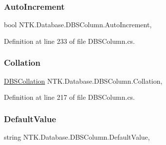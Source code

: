 \subsubsection{\texorpdfstring{AutoIncrement}{AutoIncrement}}
{\footnotesize\ttfamily bool N\+T\+K.\+Database.\+D\+B\+S\+Column.\+Auto\+Increment\hspace{0.3cm}{\ttfamily [get]}, {\ttfamily [set]}}







Definition at line 233 of file D\+B\+S\+Column.\+cs.

\mbox{\label{class_n_t_k_1_1_database_1_1_d_b_s_column_a55a63ef2aebbc005cb1ac91fd4c69a1f}} 
\subsubsection{\texorpdfstring{Collation}{Collation}}
{\footnotesize\ttfamily \mbox{\hyperlink{namespace_n_t_k_1_1_database_aa31c221c4926a0f02117557ca9883c03}{D\+B\+S\+Collation}} N\+T\+K.\+Database.\+D\+B\+S\+Column.\+Collation\hspace{0.3cm}{\ttfamily [get]}, {\ttfamily [set]}}







Definition at line 217 of file D\+B\+S\+Column.\+cs.

\mbox{\label{class_n_t_k_1_1_database_1_1_d_b_s_column_a64976b55e944f49a086a76c8f556bcca}} 
\subsubsection{\texorpdfstring{DefaultValue}{DefaultValue}}
{\footnotesize\ttfamily string N\+T\+K.\+Database.\+D\+B\+S\+Column.\+Default\+Value\hspace{0.3cm}{\ttfamily [get]}, {\ttfamily [set]}}







